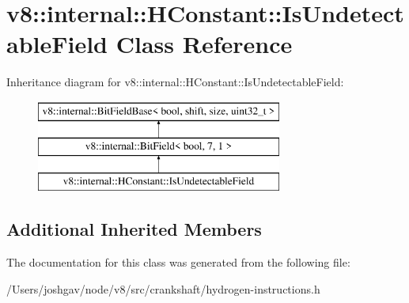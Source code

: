\hypertarget{classv8_1_1internal_1_1_h_constant_1_1_is_undetectable_field}{}\section{v8\+:\+:internal\+:\+:H\+Constant\+:\+:Is\+Undetectable\+Field Class Reference}
\label{classv8_1_1internal_1_1_h_constant_1_1_is_undetectable_field}
Inheritance diagram for v8\+:\+:internal\+:\+:H\+Constant\+:\+:Is\+Undetectable\+Field\+:\begin{figure}[H]
\begin{center}
\leavevmode
\includegraphics[height=3.000000cm]{classv8_1_1internal_1_1_h_constant_1_1_is_undetectable_field}
\end{center}
\end{figure}
\subsection*{Additional Inherited Members}


The documentation for this class was generated from the following file\+:\begin{DoxyCompactItemize}
\item 
/\+Users/joshgav/node/v8/src/crankshaft/hydrogen-\/instructions.\+h\end{DoxyCompactItemize}
